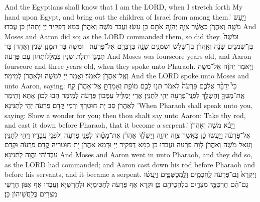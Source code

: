 {{And the Egyptians shall know that I am the LORD, when I stretch forth My hand upon Egypt, and bring out the children of Israel from among them.’}{}
{וַיַּ֥עַשׂ מֹשֶׁ֖ה וְאַהֲרֹ֑ן כַּאֲשֶׁ֨ר צִוָּ֧ה יְהֹוָ֛ה אֹתָ֖ם כֵּ֥ן עָשֽׂוּ׃}
{וַעֲבַד מֹשֶׁה וְאַהֲרֹן כְּמָא דְּפַקֵּיד יְיָ יָתְהוֹן כֵּן עֲבַדוּ׃}
{And Moses and Aaron did so; as the LORD commanded them, so did they.}{}
{וּמֹשֶׁה֙ בֶּן־שְׁמֹנִ֣ים שָׁנָ֔ה וְאַֽהֲרֹ֔ן בֶּן־שָׁלֹ֥שׁ וּשְׁמֹנִ֖ים שָׁנָ֑ה בְּדַבְּרָ֖ם אֶל־פַּרְעֹֽה׃ \petucha }
{וּמֹשֶׁה בַּר תְּמָנַן שְׁנִין וְאַהֲרֹן בַּר תְּמָנַן וּתְלָת שְׁנִין בְּמַלָּלוּתְהוֹן עִם פַּרְעֹה׃}
{And Moses was fourscore years old, and Aaron fourscore and three years old, when they spoke unto Pharaoh.}{}
{וַיֹּ֣אמֶר יְהֹוָ֔ה אֶל־מֹשֶׁ֥ה וְאֶֽל־אַהֲרֹ֖ן לֵאמֹֽר׃}
{וַאֲמַר יְיָ לְמֹשֶׁה וּלְאַהֲרֹן לְמֵימַר׃}
{And the LORD spoke unto Moses and unto Aaron, saying:}{}
{כִּי֩ יְדַבֵּ֨ר אֲלֵכֶ֤ם פַּרְעֹה֙ לֵאמֹ֔ר תְּנ֥וּ לָכֶ֖ם מוֹפֵ֑ת וְאָמַרְתָּ֣ אֶֽל־אַהֲרֹ֗ן קַ֧ח אֶֽת־מַטְּךָ֛ וְהַשְׁלֵ֥ךְ לִפְנֵֽי־פַרְעֹ֖ה יְהִ֥י לְתַנִּֽין׃
}
{אֲרֵי יְמַלֵּיל עִמְּכוֹן פַּרְעֹה לְמֵימַר הַבוּ לְכוֹן אָתָא וְתֵימַר לְאַהֲרֹן סַב יָת חוּטְרָךְ וּרְמִי קֳדָם פַּרְעֹה יְהֵי לְתַנִּינָא׃}
{’When Pharaoh shall speak unto you, saying: Show a wonder for you; then thou shalt say unto Aaron: Take thy rod, and cast it down before Pharaoh, that it become a serpent.’}{}
{וַיָּבֹ֨א מֹשֶׁ֤ה וְאַהֲרֹן֙ אֶל־פַּרְעֹ֔ה וַיַּ֣עֲשׂוּ כֵ֔ן כַּאֲשֶׁ֖ר צִוָּ֣ה יְהֹוָ֑ה וַיַּשְׁלֵ֨ךְ אַהֲרֹ֜ן אֶת־מַטֵּ֗הוּ לִפְנֵ֥י פַרְעֹ֛ה וְלִפְנֵ֥י עֲבָדָ֖יו וַיְהִ֥י לְתַנִּֽין׃
}
{וְעָאל מֹשֶׁה וְאַהֲרֹן לְוָת פַּרְעֹה וַעֲבַדוּ כֵן כְּמָא דְּפַקֵּיד יְיָ וּרְמָא אַהֲרֹן יָת חוּטְרֵיהּ קֳדָם פַּרְעֹה וּקְדָם עַבְדּוֹהִי וַהֲוָה לְתַנִּינָא׃}
{And Moses and Aaron went in unto Pharaoh, and they did so, as the LORD had commanded; and Aaron cast down his rod before Pharaoh and before his servants, and it became a serpent.}{}
{וַיִּקְרָא֙ גַּם־פַּרְעֹ֔ה לַֽחֲכָמִ֖ים וְלַֽמְכַשְּׁפִ֑ים וַיַּֽעֲשׂ֨וּ גַם־הֵ֜ם חַרְטֻמֵּ֥י מִצְרַ֛יִם בְּלַהֲטֵיהֶ֖ם כֵּֽן׃
}
{וּקְרָא אַף פַּרְעֹה לְחַכִּימַיָּא וּלְחָרָשַׁיָּא וַעֲבַדוּ אַף אִנּוּן חָרָשֵׁי מִצְרַיִם בְּלַחֲשֵׁיהוֹן כֵּן׃}
}
